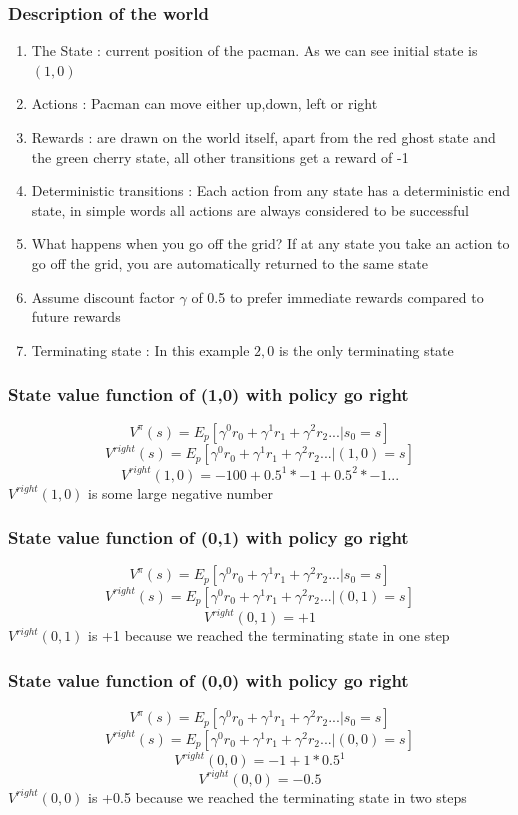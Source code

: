 \documentclass[11pt]{article}
\begin{document}
\subsubsection{Description of the world}
\begin{enumerate}
\item The State : current position of the pacman. As we can see initial state is $(1,0)$ 
\item Actions : Pacman can move either up,down, left or right 
\item Rewards : are drawn on the world itself, apart from the red ghost state and the green cherry state, all other transitions get a reward of -1 
\item Deterministic transitions : Each action from any state has a deterministic end state, in simple words all actions are always considered to be successful
\item What happens when you go off the grid? If at any state you take an action to go off the grid, you are automatically returned to the same state
\item Assume discount factor $ \gamma$ of 0.5 to prefer immediate rewards compared to future rewards
\item Terminating state : In this example ${2,0}$ is the only terminating state
\end{enumerate}


\subsubsection{State value function of (1,0) with policy go right}
$$ V^\pi(s) = E_p[\gamma^0r_0 + \gamma^1r_1 + \gamma^2r_2 ... | s_0 = s]$$
$$ V^{right}(s) = E_p[\gamma^0r_0 + \gamma^1r_1 + \gamma^2r_2 ... | (1,0) = s]$$
$$ V^{right}(1,0) = -100 + 0.5^1*-1 + 0.5^2*-1 ... $$
$ V^{right}(1,0) $ is some large negative number

\subsubsection{State value function of (0,1) with policy go right}
$$ V^\pi(s) = E_p[\gamma^0r_0 + \gamma^1r_1 + \gamma^2r_2 ... | s_0 = s]$$
$$ V^{right}(s) = E_p[\gamma^0r_0 + \gamma^1r_1 + \gamma^2r_2 ... | (0,1) = s]$$
$$ V^{right}(0,1) = +1 $$
$ V^{right}(0,1) $ is +1 because we reached the terminating state in one step

\subsubsection{State value function of (0,0) with policy go right}
$$ V^\pi(s) = E_p[\gamma^0r_0 + \gamma^1r_1 + \gamma^2r_2 ... | s_0 = s]$$
$$ V^{right}(s) = E_p[\gamma^0r_0 + \gamma^1r_1 + \gamma^2r_2 ... | (0,0) = s]$$
$$ V^{right}(0,0) = -1 +1*0.5^1 $$
$$ V^{right}(0,0) = -0.5 $$
$ V^{right}(0,0) $ is +0.5 because we reached the terminating state in two steps
\end{document}
